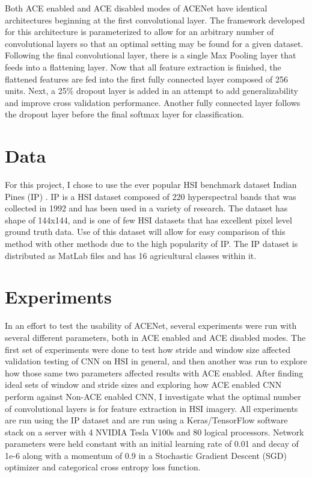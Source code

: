 \documentclass[12pt]{article}
\begin{document}
Both ACE enabled and ACE disabled modes of ACENet have identical architectures beginning at the first convolutional layer.
%
The framework developed for this architecture is parameterized to allow for an arbitrary number of convolutional layers so that an optimal setting may be found for a given dataset.
%
Following the final convolutional layer, there is a single Max Pooling layer that feeds into a flattening layer.
%
Now that all feature extraction is finished, the flattened features are fed into the first fully connected layer composed of 256 units.
%
Next, a 25\% dropout layer is added in an attempt to add generalizability and improve cross validation performance.
%
Another fully connected layer follows the dropout layer before the final softmax layer for classification.



%
\section{Data}\label{sec:data}
For this project, I chose to use the ever popular HSI benchmark dataset Indian Pines (IP) \cite{IP}.
%
IP is a HSI dataset composed of 220 hyperspectral bands that was collected in 1992 and has been used in a variety of research.
%
The dataset has shape of 144x144, and is one of few HSI datasets that has excellent pixel level ground truth data.
%
Use of this dataset will allow for easy comparison of this method with other methods due to the high popularity of IP.
%
The IP dataset is distributed as MatLab files and has 16 agricultural classes within it.

%
\section{Experiments}\label{sec:experiments}

In an effort to test the usability of ACENet, several experiments were run with several different parameters, both in ACE enabled and ACE disabled modes. 
%
The first set of experiments were done to test how stride and window size affected validation testing of CNN on HSI in general, and then another was run to explore how those same two parameters affected results with ACE enabled.
%
After finding ideal sets of window and stride sizes and exploring how ACE enabled CNN perform against Non-ACE enabled CNN, I investigate what the optimal number of convolutional layers is for feature extraction in HSI imagery.
%
All experiments are run using the IP dataset and are run using a Keras/TensorFlow software stack on a server with 4 NVIDIA Tesla V100s and 80 logical processors.
%
Network parameters were held constant with an initial learning rate of 0.01 and decay of 1e-6 along with a momentum of 0.9 in a Stochastic Gradient Descent (SGD) optimizer and categorical cross entropy loss function.
% 
\end{document}
